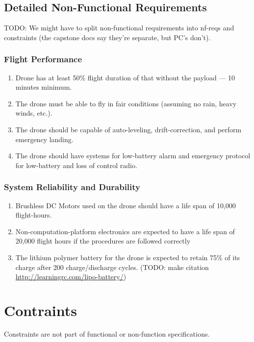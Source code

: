 \documentclass[10pt,letterpaper]{article}
\begin{document}
\subsection{Detailed Non-Functional Requirements}

TODO: We might have to split non-functional requirements into nf-reqs and constraints (the capstone docs say they're separate, but PC's don't).

\subsubsection{Flight Performance}
\begin{enumerate}[{NF.FP}.1:]
    \item Drone has at least 50\% flight duration of that without the payload --- 10 minutes minimum.
    \item The drone must be able to fly in fair conditions (assuming no rain, heavy winds, etc.).
    \item The drone should be capable of auto-leveling, drift-correction, and perform emergency landing.
    \item The drone should have systems for low-battery alarm and emergency protocol for low-battery and loss of control radio.
\end{enumerate}

\subsubsection{System Reliability and Durability}
\begin{enumerate}[{NF.SR}.1:]
    \item Brushless DC Motors used on the drone should have a life span of 10,000 flight-hours.
    \item Non-computation-platform electronics are expected to have a life span of 20,000 flight hours if the procedures are followed correctly
    \item The lithium polymer battery for the drone is expected to retain 75\% of its charge after 200 charge/discharge cycles. (TODO: make citation \url{http://learningrc.com/lipo-battery/}) 
\end{enumerate}

\section{Contraints}

Constraints are not part of functional or non-function specifications.
\end{document}
